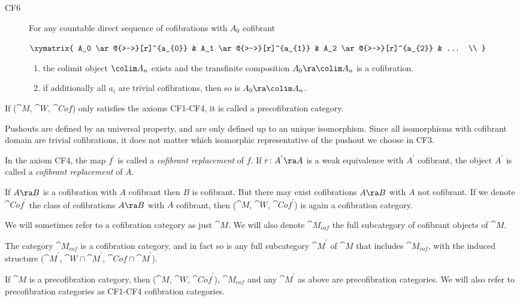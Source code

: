 \begin{defn}
\begin{description}
\item[CF6]
For any countable direct sequence of cofibrations with $A_0$ cofibrant
\begin{center}
$ \xymatrix {
        A_0 \ar@{>->}[r]^{a_{0}} &
        A_1 \ar@{>->}[r]^{a_{1}} &
        A_2 \ar@{>->}[r]^{a_{2}} &
	... \\
	}$
\end{center}
\begin{enumerate}
\item
the colimit object $\colim A_n$ exists and the transfinite composition $A_0 \ra \colim A_n$ is a cofibration.
\item
if additionally all $a_i$ are trivial cofibrations, then so is $A_0 \ra \colim A_n$.
\end{enumerate}
\end{description}

If (${\cat M}$, ${\cat W}$, ${\cat Cof}$) only satisfies the axioms CF1-CF4, it is called a precofibration category.
\end{defn}

Pushouts are defined by an universal property, and are only defined up to an unique isomorphism. Since all isomorphisms with cofibrant domain are trivial cofibrations, it does not matter which isomorphic representative of the pushout we choose in CF3.

In the axiom CF4, the map $f^{'}$ is called a {\it cofibrant replacement} of $f$. If $r \colon A^{'} \ra A$ is a weak equivalence with $A^{'}$ cofibrant, the object $A^{'}$ is called a {\it cofibrant replacement} of $A$.

If $A \ra B$ is a cofibration with $A$ cofibrant then $B$ is cofibrant. But there may exist cofibrations $A \ra B$ with $A$ not cofibrant. If we denote ${\cat Cof}^{'}$ the class of cofibrations $A \ra B$ with $A$ cofibrant, then (${\cat M}$, ${\cat W}$, ${\cat Cof}^{'}$) is again a cofibration category. 

We will sometimes refer to a cofibration category as just ${\cat M}$. We will also denote ${\cat M}_{cof}$  the full subcategory of cofibrant objects of ${\cat M}$. 

The category ${\cat M}_{cof}$ is a cofibration category, and in fact so is any full subcategory ${\cat M}^{'}$ of ${\cat M}$ that includes ${\cat M}_{cof}$, with the induced structure (${\cat M}^{'}$, ${\cat W} \cap {\cat M}^{'}$, ${\cat Cof} \cap {\cat M}^{'}$). 

If ${\cat M}$ is a precofibration category, then (${\cat M}$, ${\cat W}$, ${\cat Cof}^{'}$), ${\cat M}_{cof}$ and any ${\cat M}^{'}$ as above are precofibration categories. We will also refer to precofibration categories as CF1-CF4 cofibration categories.

